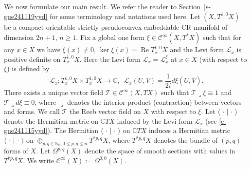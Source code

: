 \documentclass[12pt]{amsart}
\theoremstyle{definition}
\theoremstyle{named}
\numberwithin{equation}{subsection}
\newcommand{\C}{\mathbb{C}}
\def\cC{\mathscr{C}}
\begin{document}
We now formulate our main result. We refer the reader to Section~\ref{s-gue241119yyd} for some terminology and notations used here. 
Let $(X,T^{1,0}X)$ be a compact orientable strictly pseudoconvex embeddable CR manifold of dimension $2n+1$, \(n\geq 1\). Fix a global one form $\xi\in\cC^\infty(X,T^*X)$ such that for any \(x\in X\) we have $\xi(x)\neq0$,  $\ker\xi(x)=\operatorname{Re}T_x^{1,0}X$ and the Levi form $\mathcal{L}_x$ is positive definite on \(T^{1,0}_xX\). Here the Levi form $\mathcal{L}_x=\mathcal{L}^\xi_x$ at \(x\in X\) (with respect to \(\xi\)) is defined by 
\[\mathcal{L}_x\colon T^{1,0}_xX\times T^{1,0}_xX\to\C,\,\,\,\mathcal{L}_x(U,V)=\frac{1}{2i}d\xi(U,\overline{V}).\]
 There exists a unique vector field $\mathcal{T}\in\cC^\infty(X,TX)$ such that $\mathcal{T}\lrcorner\xi\equiv1$ and $\mathcal{T}\lrcorner d\xi\equiv 0$, where \(\lrcorner\) denotes the interior product (contraction) between vectors and forms. We call $\mathcal{T}$  the Reeb vector field on $X$ with respect to $\xi$. Let $\langle\,\cdot\,|\,\cdot\,\rangle$ denote the Hermitian metric on $\mathbb CTX$ 
 induced by the Levi form $\mathcal{L}_x$ (see \eqref{e-gue241115yyd}). The Hermitian $\langle\,\cdot\,|\,\cdot\,\rangle$ on $\mathbb CTX$ induces a Hermitian metric 
$\langle\,\cdot\,|\,\cdot\,\rangle$ on $\oplus_{p,q\in\mathbb N_0,0\leq p,q\leq n}T^{*p,q}X$, where $T^{*p,q}X$ denotes the bundle of $(p,q)$ forms of $X$. Let $\Omega^{p,q}(X)$
denote the space of smooth sections with values in $T^{*p,q}X$. We write $\cC^\infty(X):=\Omega^{0,0}(X)$. 
\end{document}
